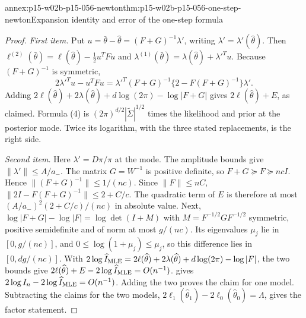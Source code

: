 \begin{annexitem}{annex:p15-w02b-p15-056-newton}{thm:p15-w02b-p15-056-one-step-newton}{Expansion identity and error of the one-step formula}
\begin{proof}
\emph{First item.} Put \(u=\bar\theta-\widehat\theta=(F+G)^{-1}\lambda'\),
writing \(\lambda'=\lambda'(\widehat\theta)\). Then
\(\ell^{(2)}(\bar\theta)=\ell(\widehat\theta)-\tfrac12u^TFu\) and
\(\lambda^{(1)}(\bar\theta)=\lambda(\widehat\theta)+\lambda'^Tu\).
Because \((F+G)^{-1}\) is symmetric,
\[
 2\lambda'^Tu-u^TFu
 =\lambda'^T(F+G)^{-1}\{2-F(F+G)^{-1}\}\lambda' .
\]
Adding \(2\ell(\widehat\theta)+2\lambda(\widehat\theta)+d\log(2\pi)-\log|F+G|\)
gives \(2\ell(\widehat\theta)+E\), as claimed. Formula (4) is
\((2\pi)^{d/2}|\widetilde\Sigma|^{1/2}\) times the likelihood and prior
at the posterior mode. Twice its logarithm, with the three stated
replacements, is the right side.

\emph{Second item.} Here \(\lambda'=D\pi/\pi\) at the mode. The amplitude
bounds give \(\|\lambda'\|\leq A/a_-\). The matrix \(G=W^{-1}\) is
positive definite, so \(F+G\succeq F\succeq ncI\). Hence
\(\|(F+G)^{-1}\|\leq1/(nc)\). Since \(\|F\|\leq nC\),
\(\|2I-F(F+G)^{-1}\|\leq2+C/c\). The quadratic term of \(E\) is
therefore at most \((A/a_-)^2(2+C/c)/(nc)\) in absolute value. Next,
\(\log|F+G|-\log|F|=\log\det(I+M)\) with
\(M=F^{-1/2}GF^{-1/2}\) symmetric, positive semidefinite and of norm at
most \(g/(nc)\). Its eigenvalues \(\mu_j\) lie in \([0,g/(nc)]\), and
\(0\leq\log(1+\mu_j)\leq\mu_j\), so this difference lies in
\([0,dg/(nc)]\). With
\(2\log\widehat I_{\rm MLE}=2\ell(\widehat\theta)+2\lambda(\widehat\theta)+d\log(2\pi)-\log|F|\),
the two bounds give
\(2\ell(\widehat\theta)+E-2\log\widehat I_{\rm MLE}=O(n^{-1})\).
 gives
\(2\log I_n-2\log\widehat I_{\rm MLE}=O(n^{-1})\). Adding the two
proves the claim for one model. Subtracting the claims for the two
models, \(2\ell_1(\widehat\theta_1)-2\ell_0(\widehat\theta_0)=\Lambda\),
gives the factor statement.


\end{proof}
\end{annexitem}
